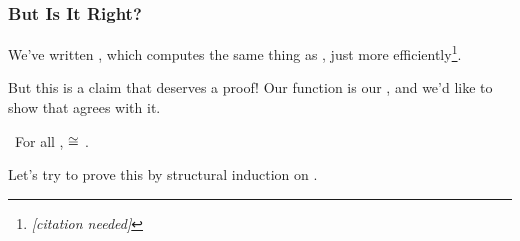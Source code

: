 \documentclass[aspectratio=169]{beamer}
\begin{document}



\begin{frame}[fragile]
  \frametitle{But Is It Right?}

  We've written , which computes the same thing as
  , just more efficiently\footnote{\textit{\color{blue}[citation needed]}}.

  \pause
  \vspace{\fill}

  But this is a claim that deserves a proof! Our  function is our
  , and we'd like to show that 
  agrees with it.

  \pause
  \vspace{\fill}

  \thmBox{}\, For all ,  $\cong$ .

  \pause
  \vspace{\fill}

  Let's try to prove this by structural induction on .
\end{frame}
\end{document}
